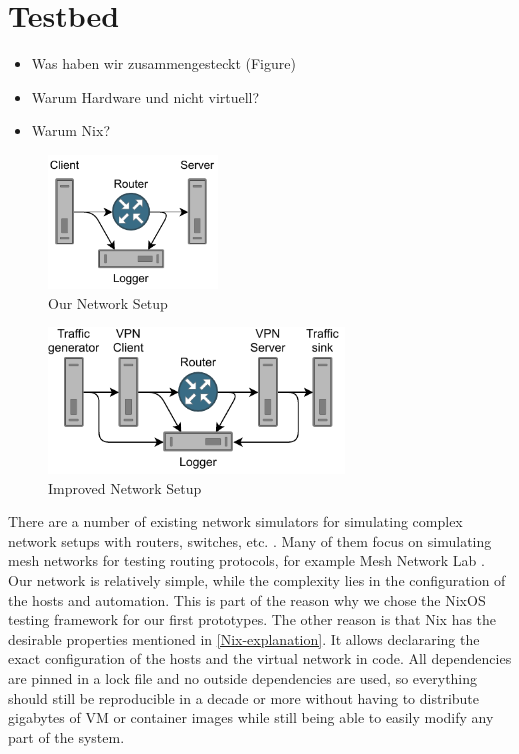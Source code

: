 \section{Testbed}
\begin{itemize}
  \item Was haben wir zusammengesteckt (Figure)
  \item Warum Hardware und nicht virtuell?
  \item Warum Nix?
\end{itemize}
\begin{figure}[tbh]
	\centering
	\includegraphics[draft=false,width=0.4\textwidth]{figures/Network schematic/actual/setup.pdf}
	\caption{Our Network Setup}\label{fig:actual_network_schematic}
\end{figure}
\begin{figure}[tbh]
	\centering
	\includegraphics[draft=false,width=0.7\textwidth]{figures/Network schematic/optimal/setup.pdf}
	\caption{Improved Network Setup}\label{fig:optimal_network_schematic}
\end{figure}
There are a number of existing network simulators for simulating complex network setups with routers, switches, etc. \cite{network-simulators-list}.
Many of them focus on simulating mesh networks for testing routing protocols, for example Mesh Network Lab \cite{meshnet-lab}.
Our network is relatively simple, while the complexity lies in the configuration of the hosts and automation.
This is part of the reason why we chose the NixOS testing framework for our first prototypes.
The other reason is that Nix has the desirable properties mentioned in \ref{Nix-explanation}.
It allows declararing the exact configuration of the hosts and the virtual network in code.
All dependencies are pinned in a lock file and no outside dependencies are used, so everything should still be reproducible in a decade or more without having to distribute gigabytes of VM or container images while still being able to easily modify any part of the system.


